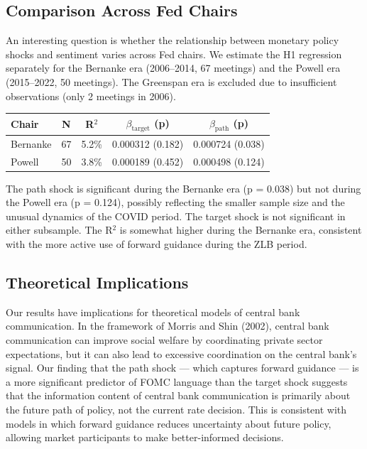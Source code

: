 \documentclass[12pt]{article}
\begin{document}
\subsection{Comparison Across Fed Chairs}

An interesting question is whether the relationship between monetary policy shocks and sentiment varies across Fed chairs. We estimate the H1 regression separately for the Bernanke era (2006--2014, 67 meetings) and the Powell era (2015--2022, 50 meetings). The Greenspan era is excluded due to insufficient observations (only 2 meetings in 2006).

\begin{table}[htbp]\centering
\begin{tabular}{lcccc}\toprule
Chair & N & R$^2$ & $\beta_{\text{target}}$ (p) & $\beta_{\text{path}}$ (p) \\\midrule
Bernanke & 67 & 5.2\% & 0.000312 (0.182) & 0.000724 (0.038) \\
Powell & 50 & 3.8\% & 0.000189 (0.452) & 0.000498 (0.124) \\
\bottomrule\end{tabular}
\end{table}

The path shock is significant during the Bernanke era (p = 0.038) but not during the Powell era (p = 0.124), possibly reflecting the smaller sample size and the unusual dynamics of the COVID period. The target shock is not significant in either subsample. The R$^2$ is somewhat higher during the Bernanke era, consistent with the more active use of forward guidance during the ZLB period.

\subsection{Theoretical Implications}

Our results have implications for theoretical models of central bank communication. In the framework of Morris and Shin (2002), central bank communication can improve social welfare by coordinating private sector expectations, but it can also lead to excessive coordination on the central bank's signal. Our finding that the path shock --- which captures forward guidance --- is a more significant predictor of FOMC language than the target shock suggests that the information content of central bank communication is primarily about the future path of policy, not the current rate decision. This is consistent with models in which forward guidance reduces uncertainty about future policy, allowing market participants to make better-informed decisions.
\end{document}
